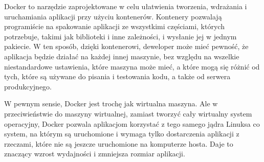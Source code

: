 Docker to narzędzie zaprojektowane w celu ułatwienia tworzenia, wdrażania i uruchamiania aplikacji przy użyciu kontenerów. Kontenery pozwalają programiście na spakowanie aplikacji ze wszystkimi częściami, których potrzebuje, takimi jak biblioteki i inne zależności, i wysłanie jej w jednym pakiecie. W ten sposób, dzięki kontenerowi, deweloper może mieć pewność, że aplikacja będzie działać na każdej innej maszynie, bez względu na wszelkie niestandardowe ustawienia, które maszyna może mieć, a które mogą się różnić od tych, które są używane do pisania i testowania kodu, a także od serwera produkcyjnego.

W pewnym sensie, Docker jest trochę jak wirtualna maszyna. Ale w przeciwieństwie do maszyny wirtualnej, zamiast tworzyć cały wirtualny system operacyjny, Docker pozwala aplikacjom korzystać z tego samego jądra Linuksa co system, na którym są uruchomione i wymaga tylko dostarczenia aplikacji z rzeczami, które nie są jeszcze uruchomione na komputerze hosta. Daje to znaczący wzrost wydajności i zmniejsza rozmiar aplikacji.